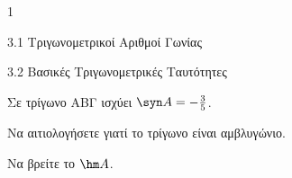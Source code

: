 \begin{ylh}{1}
\item 3.1 Τριγωνομετρικοί Αριθμοί Γωνίας
\item 3.2 Βασικές Τριγωνομετρικές Ταυτότητες
\end{ylh}
Σε τρίγωνο ΑΒΓ ισχύει $\syn  A = -\frac{3}{5}$.
\begin{alist}
\item Να αιτιολογήσετε γιατί το τρίγωνο είναι αμβλυγώνιο.
\item Να βρείτε το $\hm  A$.
\end{alist}

